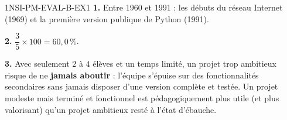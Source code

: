 %
%
\begin{corrige}{1NSI-PM-EVAL-B-EX1}
\textbf{1.} Entre 1960 et 1991 : les débuts du réseau Internet (1969) et la première
version publique de Python (1991).

\textbf{2.} $\dfrac{3}{5}\times100=60{,}0\,\%$.

\textbf{3.} Avec seulement $2$ à $4$ élèves et un temps limité, un projet trop ambitieux
risque de ne \textbf{jamais aboutir} : l'équipe s'épuise sur des fonctionnalités
secondaires sans jamais disposer d'une version complète et testée. Un projet modeste mais
terminé et fonctionnel est pédagogiquement plus utile (et plus valorisant) qu'un projet
ambitieux resté à l'état d'ébauche.
\end{corrige}

